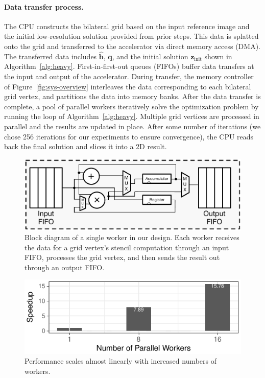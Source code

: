 \paragraph{Data transfer process. }The CPU constructs the bilateral grid based on the input reference image and the initial low-resolution solution provided from prior steps. 
This data is splatted onto the grid and transferred to the accelerator via direct memory access (DMA).
The transferred data includes $\hat{\mathbf{b}}$, $\mathbf{q}$, and the initial solution $\mathbf{z}_{\mathrm{init}}$ shown in Algorithm~\ref{alg:heavy}.
First-in-first-out queues (FIFOs) buffer data transfers at the input and output of the accelerator. 
During transfer, the memory controller of Figure~\ref{fig:sys-overview} interleaves the data corresponding to each bilateral grid vertex, and partitions the data into memory banks.  
After the data transfer is complete, a pool of parallel workers iteratively solve the optimization problem by running the loop of Algorithm~\ref{alg:heavy}.
Multiple grid vertices are processed in parallel and the results are updated in place.
After some number of iterations (we chose 256 iterations for our experiments to ensure convergence), the CPU reads back the final solution and slices it into a 2D result.

\begin{figure}[h]
\centering
\includegraphics[width=.5\columnwidth]{hfbs-figs/worker_microarchitecture.pdf}

\caption{Block diagram of a single worker in our design. 
Each worker receives the data for a grid vertex's stencil computation through an input FIFO, processes the grid vertex, and then sends the result out through an output FIFO.
}
\label{fig:microarch-single-worker}

\end{figure}



\begin{figure}[h]
\centering
\includegraphics[width=.5\columnwidth]{hfbs-figs/worker_scaling.pdf}
\caption{Performance scales almost linearly with increased numbers of workers.}
\label{fig:worker-perf}
\end{figure}

